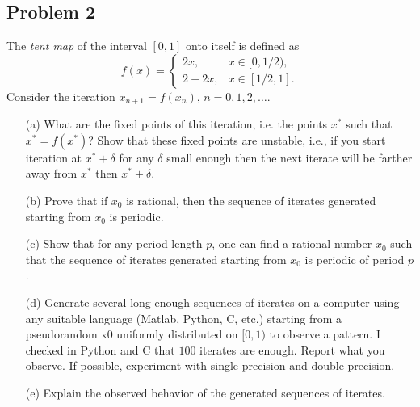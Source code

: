 \documentclass[12pt]{report}
\begin{document}
\begin{problem}%
\subsection*{Problem 2}
The \textit{tent map} of the interval $[0,1]$ onto itself is defined as
\[
  f(x) = \begin{cases}
    2x, & x \in [0,1/2),\\
    2 - 2x, &x \in [1/2,1].
  \end{cases}  
\]
Consider the iteration $x_{n+1} = f(x_n)$, $n=0,1,2,\dots$.

\begin{enumerate}
    \item [(a)]
    What are the fixed points of this iteration, i.e. the points $x^*$ such that $x^* = f(x^*)$? Show that these fixed points are unstable, i.e., if you start iteration at $x^* + \delta$ for any $\delta$
    small enough then the next iterate will be farther away from $x^*$ then $x^* + \delta$.

    \item [(b)]
    Prove that if $x_0$ is rational, then the sequence of iterates generated starting from $x_0$ is periodic.


    \item [(c)]
    Show that for any period length $p$, one can find a rational number $x_0$ such that the sequence of iterates generated starting from $x_0$ is periodic of period $p$.


    \item [(d)]
    Generate several long enough sequences of iterates on a computer using any suitable language (Matlab, Python, C, etc.) starting from a pseudorandom x0 uniformly distributed on $[0, 1)$ to observe a pattern. I checked in Python and C that $100$ iterates are enough. Report what you observe. If possible, experiment with single precision and double precision.

    \item [(e)]
    Explain the observed behavior of the generated sequences of iterates.


\end{enumerate}


\end{problem}
\end{document}
